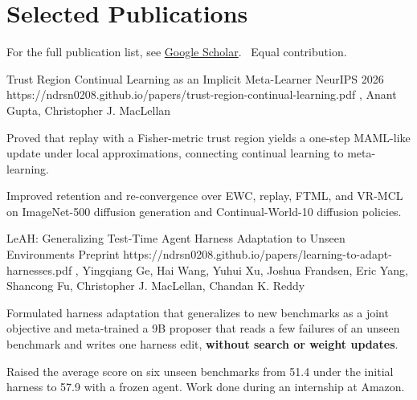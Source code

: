 \section{Selected Publications}
{\small
For the full publication list, see \href{\CVScholarURL}{Google Scholar}.
\hfill\CVEqual\ Equal contribution.\par}
\vspace{3pt}

\begin{samepage}
\CVPaperHeading
  {Trust Region Continual Learning as an Implicit Meta-Learner}
  {NeurIPS 2026}
  {https://ndrsn0208.github.io/papers/trust-region-continual-learning.pdf}
  {\CVNameInAuthors\CVEqual, Anant Gupta\CVEqual, Christopher J. MacLellan}
\begin{CVHighlights}
  \item Proved that replay with a Fisher-metric trust region yields a one-step
    MAML-like update under local approximations, connecting continual learning
    to meta-learning.
  \item Improved retention and re-convergence over EWC, replay, FTML, and VR-MCL
    on ImageNet-500 diffusion generation and Continual-World-10 diffusion policies.
\end{CVHighlights}
\end{samepage}
\CVProjectGap

\begin{samepage}
\CVPaperHeading
  {LeAH: Generalizing Test-Time Agent Harness Adaptation to Unseen Environments}
  {Preprint}
  {https://ndrsn0208.github.io/papers/learning-to-adapt-harnesses.pdf}
  {\CVNameInAuthors, Yingqiang Ge, Hai Wang, Yuhui Xu, Joshua Frandsen, Eric Yang,
   Shancong Fu, Christopher J. MacLellan, Chandan K. Reddy}
\begin{CVHighlights}
  \item Formulated harness adaptation that generalizes to new benchmarks as a joint
    objective and meta-trained a 9B proposer that reads a few failures of an unseen
    benchmark and writes one harness edit, \textbf{without search or weight updates}.
  \item Raised the average score on six unseen benchmarks from 51.4 under the initial
    harness to 57.9 with a frozen agent. Work done during an internship at Amazon.
\end{CVHighlights}
\end{samepage}
\CVProjectGap

